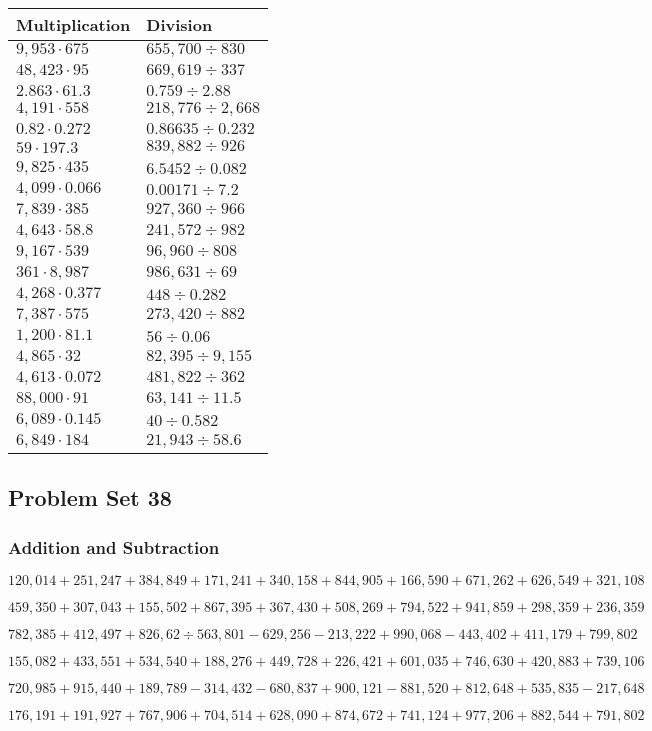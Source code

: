 \begin{longtable}[]{@{}ll@{}}
\toprule
Multiplication & Division\tabularnewline
\midrule
\endhead
\(9,953\cdot675\) & \(655,700÷830\)\tabularnewline
\(48,423\cdot95\) & \(669,619÷337\)\tabularnewline
\(2.863\cdot61.3\) & \(0.759 ÷2.88\)\tabularnewline
\(4,191\cdot558\) & \(218,776÷2,668\)\tabularnewline
\(0.82\cdot0.272\) & \(0.86635÷0.232\)\tabularnewline
\(59\cdot197.3\) & \(839,882÷926\)\tabularnewline
\(9,825\cdot435\) & \(6.5452÷0.082\)\tabularnewline
\(4,099\cdot0.066\) & \(0.00171÷7.2\)\tabularnewline
\(7,839\cdot385\) & \(927,360÷966\)\tabularnewline
\(4,643\cdot58.8\) & \(241,572÷982\)\tabularnewline
\(9,167\cdot539\) & \(96,960÷808\)\tabularnewline
\(361\cdot8,987\) & \(986,631÷69\)\tabularnewline
\(4,268\cdot0.377\) & \(448÷0.282\)\tabularnewline
\(7,387\cdot575\) & \(273,420÷882\)\tabularnewline
\(1,200\cdot81.1\) & \(56÷0.06\)\tabularnewline
\(4,865\cdot32\) & \(82,395÷9,155\)\tabularnewline
\(4,613\cdot0.072\) & \(481,822÷362\)\tabularnewline
\(88,000\cdot91\) & \(63,141÷11.5\)\tabularnewline
\(6,089\cdot0.145\) & \(40÷0.582\)\tabularnewline
\(6,849\cdot184\) & \(21,943÷58.6\)\tabularnewline
\bottomrule
\end{longtable}

\hypertarget{problem-set-38-5}{%
\subsection{Problem Set 38}\label{problem-set-38-5}}

\hypertarget{addition-and-subtraction-343}{%
\subsubsection{Addition and
Subtraction}\label{addition-and-subtraction-343}}

\(120,014+251,247+384,849+171,241+340,158+844,905+166,590+671,262+626,549+ 321,108\)

\(459,350+307,043+155,502+867,395+367,430+508,269+794,522+941,859+298,359+236,359\)

\(782,385+412,497+826,62÷563,801-629,256-213,222+990,068-443,402+411,179+799,802\)

\(155,082+433,551+534,540+188,276+449,728+226,421+601,035+746,630+420,883+739,106\)

\(720,985+915,440+189,789-314,432-680,837+900,121-881,520+812,648+535,835-217,648\)

\(176,191+191,927+767,906+704,514+628,090+874,672+741,124+977,206+882,544+791,802\)

